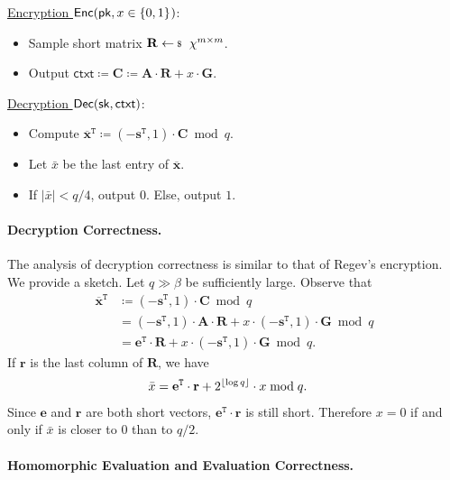 \documentclass[10pt,twoside]{article}
\newcommand{\ctxt}{\mathsf{ctxt}}
\newcommand{\bits}[1][]{\{0,1\}^{#1}}
\renewcommand{\vec}[1]{\mathbf{#1}}
\newcommand{\mat}[1]{\mathbf{#1}}
\newcommand{\transpose}{\mathtt{T}}
\begin{document}
\noindent\underline{Encryption $\enc(\pk, x \in \bits)$}:
\begin{itemize}
    \item Sample short matrix $\mat{R} \sample \chi^{m \times m}$.
    \item Output $\ctxt \coloneqq \mat{C} \coloneqq \mat{A} \cdot \mat{R} + x \cdot \mat{G}$.
\end{itemize}

\noindent\underline{Decryption $\dec(\sk, \ctxt)$}:
\begin{itemize}
    \item Compute $\overline{\vec{x}}^\transpose \coloneqq (-\vec{s}^\transpose, 1) \cdot \mat{C} \bmod q$.
    \item Let $\bar{x}$ be the last entry of $\overline{\vec{x}}$.
\item If $|\bar{x}| < q/4$, output $0$. Else, output $1$.
\end{itemize}

\paragraph{Decryption Correctness.}

The analysis of decryption correctness is similar to that of Regev's encryption.
We provide a sketch.
Let $q \gg \beta$ be sufficiently large.
Observe that
\begin{align*}
    \overline{\vec{x}}^\transpose
    &\coloneqq (-\vec{s}^\transpose, 1) \cdot \mat{C} \bmod q \\
    &= (-\vec{s}^\transpose, 1) \cdot \mat{A} \cdot \mat{R} + x \cdot (-\vec{s}^\transpose, 1) \cdot \mat{G} \bmod q \\
    &= \vec{e}^\transpose \cdot \mat{R} + x \cdot (-\vec{s}^\transpose, 1) \cdot \mat{G} \bmod q.
\end{align*}
If $\vec{r}$ is the last column of $\mat{R}$, we have
\begin{align*}
    \bar{x}
    &= \vec{e}^\transpose \cdot \vec{r} + 2^{\floor{\log q}} \cdot x \bmod q.
\end{align*}
Since $\vec{e}$ and $\vec{r}$ are both short vectors, $\vec{e}^\transpose \cdot \vec{r}$ is still short.
Therefore $x = 0$ if and only if $\bar{x}$ is closer to $0$ than to $q/2$.

\paragraph*{Homomorphic Evaluation and Evaluation Correctness.}
\end{document}
